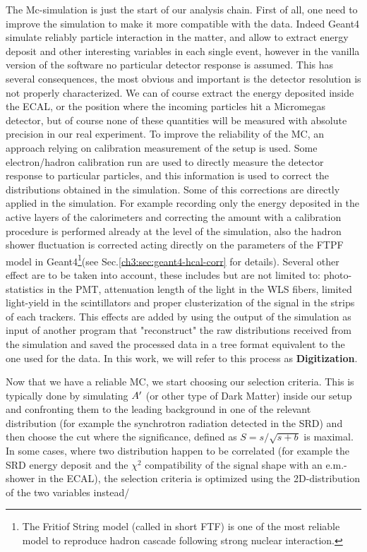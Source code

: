 The Mc-simulation is just the start of our analysis chain. First of all, one need to improve the simulation to make it more compatible with the data. Indeed Geant4 simulate reliably particle interaction in the matter, and allow to extract energy deposit and other interesting variables in each single event, however in the vanilla version of the software no particular detector response is assumed. This has several consequences, the most obvious and important is the detector resolution is not properly characterized. We can of course extract the energy deposited inside the ECAL, or the position where the incoming particles hit a Micromegas detector, but of course none of these quantities will be measured with absolute precision in our real experiment. To improve the reliability of the MC, an approach relying on calibration measurement of the setup is used. Some electron/hadron calibration run are used to directly measure the detector response to particular particles, and this information is used to correct the distributions obtained in the simulation. Some of this corrections are directly applied in the simulation. For example recording only the energy deposited in the active layers of the calorimeters and correcting the amount with a calibration procedure is performed already at the level of the simulation, also the hadron shower fluctuation is corrected acting directly on the parameters of the FTPF model in Geant4\footnote{The Fritiof String model (called in short FTF) is one of the most reliable model to reproduce hadron cascade following strong nuclear interaction\cite{Uzhinsky:2013hea}.}(see Sec.\ref{ch3:sec:geant4-hcal-corr} for details). Several other effect are to be taken into account, these includes but are not limited to: photo-statistics in the PMT, attenuation length of the light in the WLS fibers, limited light-yield in the scintillators and proper clusterization of the signal in the strips of each trackers. This effects are added by using the output of the simulation as input of another program that "reconstruct" the raw distributions received from the simulation and saved the processed data in a tree format equivalent to the one used for the data. In this work, we will refer to this process as \textbf{Digitization}.

Now that we have a reliable MC, we start choosing our selection criteria. This is typically done by simulating $A'$ (or other type of Dark Matter) inside our setup and confronting them to the leading background in one of the relevant distribution (for example the synchrotron radiation detected in the SRD) and then choose the cut where the significance, defined as $S = s/\sqrt{s+b}$ is maximal. In some cases, where two distribution happen to be correlated (for example the SRD energy deposit and the $\chi^2$ compatibility of the signal shape with an e.m.-shower in the ECAL), the selection criteria is optimized using the 2D-distribution of the two variables instead/

